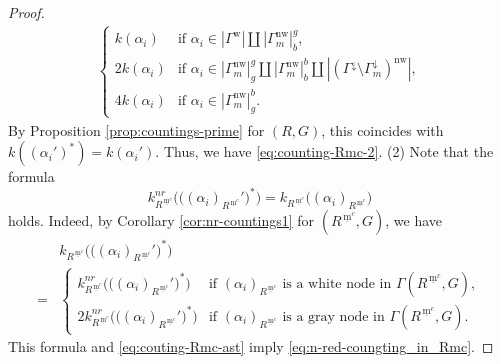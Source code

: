 \documentclass[10pt,a4paper]{amsart}
\newcommand{\mc}{\, \underline{\mathrm{m}}^c}
\newcommand{\nw}{\mathrm{nw}}
\newcommand{\w}{\mathrm{w}}
\begin{document}
\begin{proof}
\begin{align*}
\begin{cases}
k(\alpha_i) & \text{if } \alpha_i\in |\Gamma^\w|\amalg |\Gamma_m^\nw|_b^g ,\\
2k(\alpha_i) & \text{if } \alpha_i\in |\Gamma_m^\nw|_g^g\amalg |\Gamma_m^\nw|_b^b
\amalg |(\Gamma^{\downarrow}\setminus\Gamma^{\downarrow}_m)^\nw|,\\
4k(\alpha_i) & \text{if }\alpha_i\in|\Gamma_m^\nw|_g^b.
\end{cases}
\end{align*}
By Proposition \ref{prop:countings-prime} for $(R,G)$, this coincides with 
$k((\alpha_i')^\ast)=k(\alpha_i')$. Thus, we have \eqref{eq:counting-Rmc-2}.
\vskip 1mm
\noindent
(2) Note that the formula
\begin{equation}\label{eq:n-red-coungting_in_Rmc}
k_{R^{\mc}}^{nr}\big(\big((\alpha_i)_{R^{\mc}}'\big)^\ast\big)=
k_{R^{\mc}}\big((\alpha_i)_{R^{\mc}}\big)
\end{equation}
holds. Indeed, by Corollary \ref{cor:nr-countings1} for $(R^{\mc},G)$, we have
\begin{align*}
&k_{R^{\mc}}\big(\big((\alpha_i)_{R^{\mc}}'\big)^\ast\big) \\
=
&\begin{cases}
k_{R^{\mc}}^{nr}\big(\big((\alpha_i)_{R^{\mc}}'\big)^\ast\big) & 
\text{if $(\alpha_i)_{R^{\mc}}$ is a white node in $\Gamma(R^{\mc},G)$},\\
2k_{R^{\mc}}^{nr}\big(\big((\alpha_i)_{R^{\mc}}'\big)^\ast\big) &
\text{if $(\alpha_i)_{R^{\mc}}$ is a gray node in $\Gamma(R^{\mc},G)$}.
\end{cases}
\end{align*}
This formula and \eqref{eq:couting-Rmc-ast} imply
\eqref{eq:n-red-coungting_in_Rmc}.


\end{proof}
\end{document}
